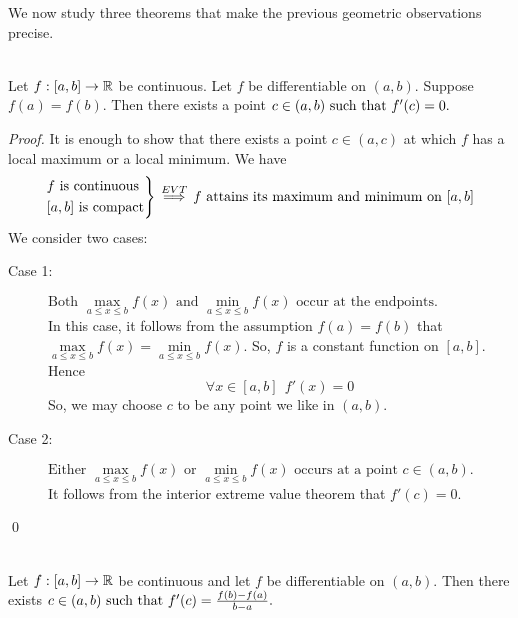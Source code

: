 We now study three theorems that make the previous geometric observations precise.

\begin{theorem} \leavevmode\\
    \label{Thm5.9}
    Let $f:[a,b] \to \mathbb{R}$ be continuous. Let $f$ be differentiable on $(a,b)$. Suppose $f(a) = f(b)$. Then there exists a point $c\in (a,b) \text{ such that } f'(c) = 0.$
\end{theorem}

\begin{proof}
    It is enough to show that there exists a point $c \in (a,c)$ at which $f$ has a local maximum or a local minimum. We have
    $$
    \begin{rcases*}
        \text{$f$ is continuous} \\
        \text{$[a,b]$ is compact}
    \end{rcases*}
    \overset{EVT}{\implies}
    \text{$f$ attains its maximum and minimum on $[a,b]$}
    $$
    We consider two cases:

    \begin{description}
        \item[Case 1: ] $\text{Both $\max \limits_{a \leq x \leq b}f(x)$ and $\min \limits_{a \leq x \leq b}f(x)$ occur at the endpoints.}$ \leavevmode\\
        In this case, it follows from the assumption $f(a) = f(b)$ that $\max \limits_{a \leq x \leq b}f(x) = \min \limits_{a \leq x \leq b}f(x)$. So, $f$ is a constant function on $[a,b]$. Hence
        $$
        \forall x \in [a,b] ~~f'(x) = 0
        $$
        So, we may choose $c$ to be any point we like in $(a,b)$.

        \item[Case 2: ] $\text{Either $\max \limits_{a \leq x \leq b}f(x)$ or $\min \limits_{a \leq x \leq b}f(x)$ occurs at a point $c\in(a,b)$.}$ \leavevmode\\
        It follows from the interior extreme value theorem that $f'(c) = 0$.
    \end{description}
    \qed
\end{proof}

\begin{theorem}\leavevmode\\
    \label{Thm5.10}
    Let $f:[a,b] \to \mathbb{R}$ be continuous and let $f$ be differentiable on $(a,b)$. Then there exists $c \in (a,b) \text{ such that } f'(c) = \frac{f(b) - f(a)}{b - a}.$
\end{theorem}


